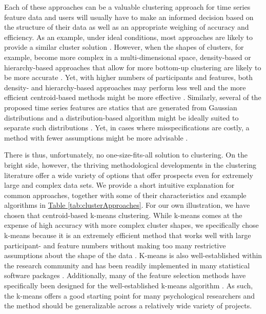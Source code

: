\documentclass[man, 12pt, a4paper, mask, floatsintext]{apa7}
\theoremstyle{break}
\theoremstyle{plain}
\newcommand{\tblref}[2][]{\hyperref[#2]{Table \ref*{#2}#1}}
\begin{document}
Each of these approaches can be a valuable clustering approach for time series feature data and users will usually have to make an informed decision based on the structure of their data as well as an appropriate weighing of accuracy and efficiency. As an example, under ideal conditions, most approaches are likely to provide a similar cluster solution \citep[e.g., for well-separated groups with little noise and few outliers; e.g., see][]{peng2022}. However, when the shapes of clusters, for example, become more complex in a multi-dimensional space, density-based or hierarchy-based approaches that allow for more bottom-up clustering are likely to be more accurate \citep[e.g.,][]{langfelder2008}. Yet, with higher numbers of participants and features, both density- and hierarchy-based approaches may perform less well and the more efficient centroid-based methods might be more effective \citep[e.g.,][]{jain2010}. Similarly, several of the proposed time series features are statics that are generated from Gaussian distributions and a distribution-based algorithm might be ideally suited to separate such distributions \citep[e.g.,][]{corduas2008}. Yet, in cases where misspecifications are costly, a method with fewer assumptions might be more advisable \citep[e.g.,][]{ankerst1999}. 

There is thus, unfortunately, no one-size-fits-all solution to clustering. On the bright side, however, the thriving methodological developments in the clustering literature offer a wide variety of options that offer prospects even for extremely large and complex data sets. We provide a short intuitive explanation for common approaches, together with some of their characteristics and example algorithms in \tblref{tab:clusterApproaches}. For our own illustration, we have chosen that centroid-based k-means clustering. While k-means comes at the expense of high accuracy with more complex cluster shapes, we specifically chose k-means because it is an extremely efficient method that works well with large participant- and feature numbers without making too many restrictive assumptions about the shape of the data \citep{jain2010}. K-means is also well-established within the research community and has been readily implemented in many statistical software packages \citep{hand2005}. Additionally, many of the feature selection methods have specifically been designed for the well-established k-means algorithm \citep[e.g.,][]{boutsidis2010}. As such, the k-means offers a good starting point for many psychological researchers and the method should be generalizable across a relatively wide variety of projects.
\end{document}
